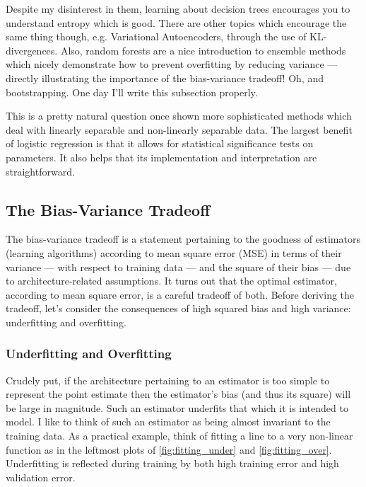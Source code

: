 \documentclass[11pt]{article}
\begin{document}
Despite my disinterest in them, learning about decision trees encourages you to understand entropy which is good. There are other topics which encourage the same thing though, e.g. Variational Autoencoders, through the use of KL-divergences. Also, random forests are a nice introduction to ensemble methods which nicely demonstrate how to prevent overfitting by reducing variance — directly illustrating the importance of the bias-variance tradeoff! Oh, and bootstrapping. One day I'll write this subsection properly.

\begin{tcolorbox}[title={\centering\textbf{Logistic regression $>$ SVM/RF when?}}, colback=myLightBlue, colbacktitle=myDarkBlue, colframe=myDarkBlue, coltitle=white]
    This is a pretty natural question once shown more sophisticated methods which deal with linearly separable and non-linearly separable data. The largest benefit of logistic regression is that it allows for statistical significance tests on parameters. It also helps that its implementation and interpretation are straightforward.
\end{tcolorbox}

\subsection{The Bias-Variance Tradeoff}
The bias-variance tradeoff is a statement pertaining to the goodness of estimators (learning algorithms) according to mean square error (MSE) in terms of their variance — with respect to training data — and the square of their bias — due to architecture-related assumptions. It turns out that the optimal estimator, according to mean square error, is a careful tradeoff of both. Before deriving the tradeoff, let's consider the consequences of high squared bias and high variance: underfitting and overfitting.

\subsubsection{Underfitting and Overfitting}
Crudely put, if the architecture pertaining to an estimator is too simple to represent the point estimate then the estimator's bias (and thus its square) will be large in magnitude. Such an estimator underfits that which it is intended to model. I like to think of such an estimator as being almost invariant to the training data. As a practical example, think of fitting a line to a very non-linear function as in the leftmost plots of \autoref{fig:fitting_under} and \autoref{fig:fitting_over}. Underfitting is reflected during training by both high training error and high validation error.
\end{document}
